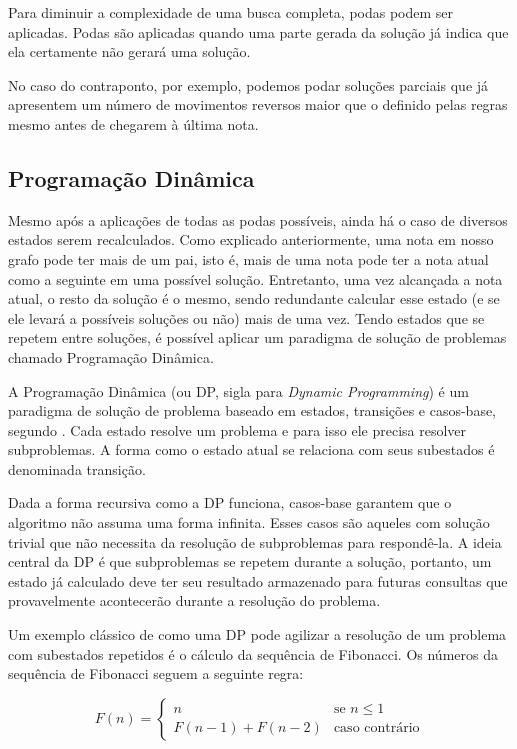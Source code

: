       Para diminuir a complexidade de uma busca completa, podas podem ser aplicadas. Podas são aplicadas quando uma parte gerada da solução já indica que ela certamente não gerará uma solução.

      No caso do contraponto, por exemplo, podemos podar soluções parciais que já apresentem um número de movimentos reversos maior que o definido pelas regras mesmo antes de chegarem à última nota.

    \subsection[Programação Dinâmica]{Programação Dinâmica}

      Mesmo após a aplicações de todas as podas possíveis, ainda há o caso de diversos estados serem recalculados. Como explicado anteriormente, uma nota em nosso grafo pode ter mais de um pai, isto é, mais de uma nota pode ter a nota atual como a seguinte em uma possível solução. Entretanto, uma vez alcançada a nota atual, o resto da solução é o mesmo, sendo redundante calcular esse estado (e se ele levará a possíveis soluções ou não) mais de uma vez. Tendo estados que se repetem entre soluções, é possível aplicar um paradigma de solução de problemas chamado Programação Dinâmica.

      A Programação Dinâmica (ou DP, sigla para \textit{Dynamic Programming}) é um paradigma de solução de problema baseado em estados, transições e casos-base, segundo . Cada estado resolve um problema e para isso ele precisa resolver subproblemas. A forma como o estado atual se relaciona com seus subestados é denominada transição.

      Dada a forma recursiva como a DP funciona, casos-base garantem que o algoritmo não assuma uma forma infinita. Esses casos são aqueles com solução trivial que não necessita da resolução de subproblemas para respondê-la. A ideia central da DP é que subproblemas se repetem durante a solução, portanto, um estado já calculado deve ter seu resultado armazenado para futuras consultas que provavelmente acontecerão durante a resolução do problema.

      Um exemplo clássico de como uma DP pode agilizar a resolução de um problema com subestados repetidos é o cálculo da sequência de Fibonacci. Os números da sequência de Fibonacci seguem a seguinte regra:

      \[ F(n) = \left\{ \begin{array}{ll}
         n & \mbox{se $n \leqslant 1$}\\
        F(n-1) + F(n-2) & \mbox{caso contrário}\end{array} \right. \]

